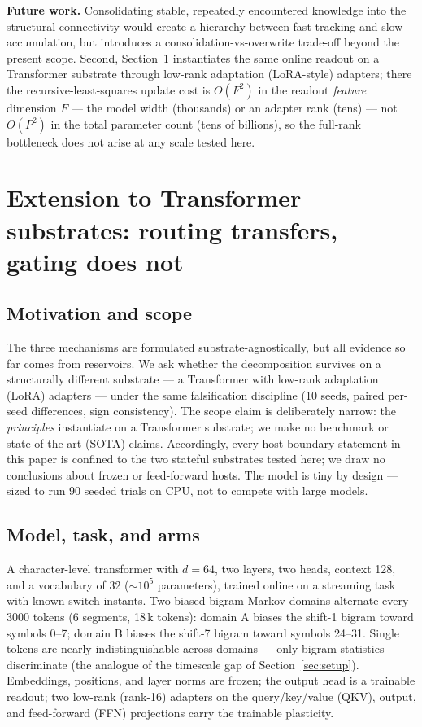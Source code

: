 \documentclass[preprint,12pt]{elsarticle}
\begin{document}
\textbf{Future work.} Consolidating stable, repeatedly encountered
knowledge into the structural connectivity would create a hierarchy
between fast tracking and slow accumulation, but introduces a
consolidation-vs-overwrite trade-off beyond the present scope. Second,
Section~\ref{sec:llm} instantiates the same online readout on a
Transformer substrate through low-rank adaptation (LoRA-style) adapters; there the
recursive-least-squares update cost is $O(F^2)$ in the readout
\emph{feature} dimension $F$ --- the model width (thousands) or an
adapter rank (tens) --- not $O(P^2)$ in the total parameter count (tens
of billions), so the full-rank bottleneck does not arise at any scale
tested here.

\section{Extension to Transformer substrates: routing transfers, gating does not}
\label{sec:llm}

\subsection{Motivation and scope}

The three mechanisms are formulated substrate-agnostically, but all
evidence so far comes from reservoirs. We ask whether the decomposition
survives on a structurally different substrate --- a Transformer with
low-rank adaptation (LoRA) adapters \cite{hu2022lora} --- under the same falsification
discipline (10 seeds, paired per-seed differences, sign consistency). The
scope claim is deliberately narrow: the \emph{principles} instantiate on
a Transformer substrate; we make no benchmark or state-of-the-art (SOTA)
claims. Accordingly, every host-boundary statement in this paper is
confined to the two stateful substrates tested here; we draw no
conclusions about frozen or feed-forward hosts. The model
is tiny by design --- sized to run 90 seeded trials on CPU, not to
compete with large models.

\subsection{Model, task, and arms}

A character-level transformer \cite{vaswani2017} with $d=64$, two layers,
two heads, context 128, and a vocabulary of 32 ($\sim10^5$ parameters),
trained online on a streaming task with known switch instants. Two
biased-bigram Markov domains alternate every 3000 tokens (6 segments,
18\,k tokens): domain A biases the shift-1 bigram toward symbols 0--7;
domain B biases the shift-7 bigram toward symbols 24--31. Single tokens
are nearly indistinguishable across domains --- only bigram statistics
discriminate (the analogue of the timescale gap of
Section~\ref{sec:setup}). Embeddings, positions, and layer norms are
frozen; the output head is a trainable readout; two low-rank (rank-16)
adapters on the query/key/value (QKV), output, and feed-forward
(FFN) projections carry the trainable plasticity.
\end{document}
